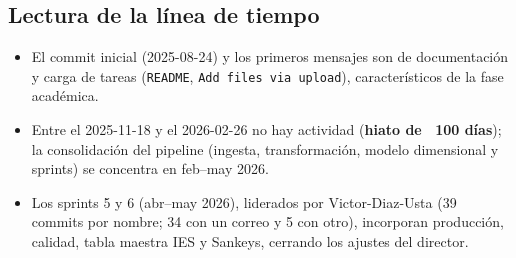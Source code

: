 \subsection{Lectura de la línea de tiempo}

\begin{itemize}
  \item El commit inicial (2025-08-24) y los primeros mensajes son de
        documentación y carga de tareas (\texttt{README}, \texttt{Add files
        via upload}), característicos de la fase académica.
  \item Entre el 2025-11-18 y el 2026-02-26 no hay actividad (\textbf{hiato de
        ~100 días}); la consolidación del pipeline (ingesta, transformación,
        modelo dimensional y sprints) se concentra en feb--may 2026.
  \item Los sprints 5 y 6 (abr--may 2026), liderados por Victor-Diaz-Usta
        (39 commits por nombre; 34 con un correo y 5 con otro), incorporan
        producción, calidad, tabla maestra IES y Sankeys, cerrando los ajustes
        del director.
\end{itemize}
